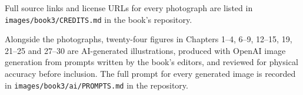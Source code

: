Full source links and license URLs for every photograph are listed
in \texttt{images/book3/CREDITS.md} in the book's repository.

\bigskip
Alongside the photographs, twenty-four figures in Chapters 1--4, 6--9,
12--15, 19, 21--25 and 27--30 are AI-generated
illustrations, produced with OpenAI image generation from prompts
written by the book's editors, and reviewed for physical accuracy
before inclusion. The full prompt for every generated image is
recorded in \texttt{images/book3/ai/PROMPTS.md} in the repository.
\clearpage

